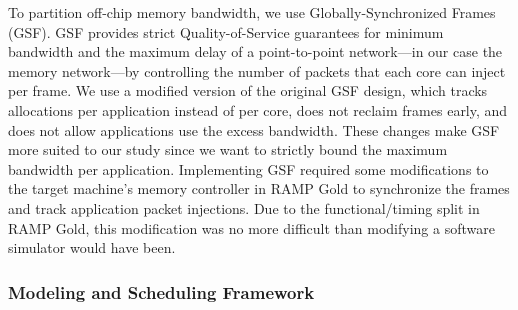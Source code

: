 To partition off-chip memory bandwidth, we use Globally-Synchronized
Frames (GSF)\cite{gsf}. GSF provides strict Quality-of-Service
guarantees for minimum bandwidth and the maximum delay of a
point-to-point network---in our case the memory network---by
controlling the number of packets that each core can inject per frame.
We use a modified version of the original GSF design, which tracks
allocations per application instead of per core, does not reclaim
frames early, and does not allow applications use the excess
bandwidth.  These changes make GSF more suited to our study since we
want to strictly bound the maximum bandwidth per application.
Implementing GSF required some modifications to the target machine's
memory controller in RAMP Gold to synchronize the frames and track
application packet injections.  Due to the functional/timing split in
RAMP Gold, this modification was no more difficult than modifying a
software simulator would have been.

\subsubsection*{Modeling and Scheduling Framework}



